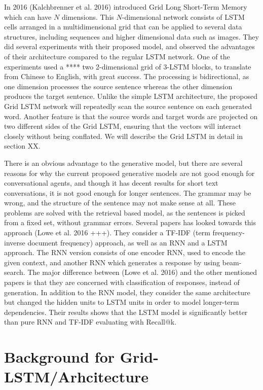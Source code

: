 \documentclass{article} %
\begin{document}
In 2016 (Kalchbrenner et al. 2016) introduced Grid Long Short-Term Memory which can have $N$ dimensions. This $N$-dimensional network consists of LSTM cells arranged in a multidimensional grid that can be applied to several data structures, including sequences and higher dimensional data such as images. They did several experiments with their proposed model, and observed the advantages of their architecture compared to the regular LSTM network. One of the experiments used a **** two 2-dimensional grid of 3-LSTM blocks, to translate from Chinese to English, with great success. The processing is bidirectional, as one dimension processes the source sentence whereas the other dimension produces the target sentence. Unlike the simple LSTM architecture, the proposed Grid LSTM network will repeatedly scan the source sentence on each generated word. Another feature is that the source words and target words are projected on two different sides of the Grid LSTM, ensuring that the vectors will interact closely without being conflated. We will describe the Grid LSTM in detail in section XX. 

There is an obvious advantage to the generative model, but there are several reasons for why the current proposed generative models are not good enough for conversational agents, and though it has decent results for short text conversations, it is not good enough for longer sentences. The grammar may be wrong, and the structure of the sentence may not make sense at all. These problems are solved with the retrieval based model, as the sentences is picked from a fixed set, without grammar errors. Several papers has looked towards this approach (Lowe et al. 2016 +++). They consider a TF-IDF (term frequency-inverse document frequency) approach, as well as an RNN and a LSTM approach. The RNN version consists of one encoder RNN, used to encode the given context, and another RNN which generates a response by using beam-search. The major difference between (Lowe et al. 2016) and the other mentioned papers is that they are concerned with classification of responses, instead of generation. In addition to the RNN model, they consider the same architecture but changed the hidden units to LSTM units in order to model longer-term dependencies. Their results shows that the LSTM model is significantly better than pure RNN and TF-IDF evaluating with Recall@k.


\section{Background for Grid-LSTM/Arhcitecture}
\end{document}
